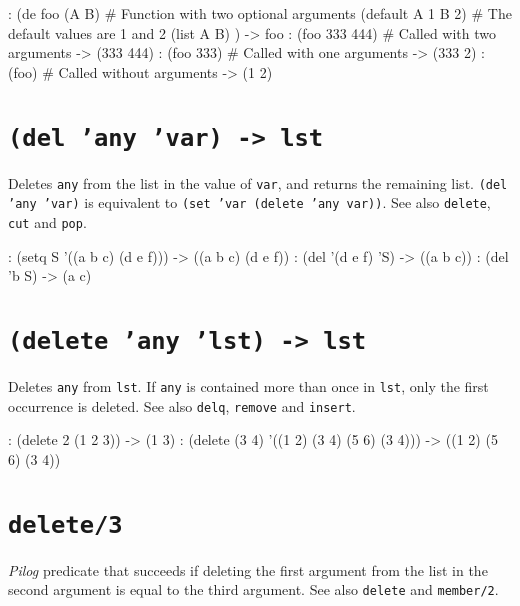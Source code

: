 {\begin{wideverbatim}
: (de foo (A B)               # Function with two optional arguments
   (default  A 1  B 2)        # The default values are 1 and 2
   (list A B) )
-> foo
: (foo 333 444)               # Called with two arguments
-> (333 444)
: (foo 333)                   # Called with one arguments
-> (333 2)
: (foo)                       # Called without arguments
-> (1 2)
\end{wideverbatim}

 
\section*{\texttt{(del 'any 'var) -> lst}}
\label{sec:func-ref-D-(del 'any 'var) -> lst}


Deletes \texttt{any} from the list in the value of \texttt{var}, and returns the
remaining list. \texttt{(del 'any 'var)} is equivalent to
\texttt{(set 'var (delete 'any var))}. See also \texttt{delete}, \texttt{cut} and \texttt{pop}.


\begin{wideverbatim}
: (setq S '((a b c) (d e f)))
-> ((a b c) (d e f))
: (del '(d e f) 'S)
-> ((a b c))
: (del 'b S)
-> (a c)
\end{wideverbatim}

 
\section*{\texttt{(delete 'any 'lst) -> lst}}
\label{sec:func-ref-D-(delete 'any 'lst) -> lst}


Deletes \texttt{any} from \texttt{lst}. If \texttt{any} is contained more than once in \texttt{lst},
only the first occurrence is deleted. See also \texttt{delq}, \texttt{remove} and
\texttt{insert}.


\begin{wideverbatim}
: (delete 2 (1 2 3))
-> (1 3)
: (delete (3 4) '((1 2) (3 4) (5 6) (3 4)))
-> ((1 2) (5 6) (3 4))
\end{wideverbatim}

 
\section*{\texttt{delete/3}}
\label{sec:func-ref-D-delete/3}


\emph{Pilog} predicate that succeeds if deleting the first
argument from the list in the second argument is equal to the third
argument. See also \texttt{delete} and \texttt{member/2}.


}
